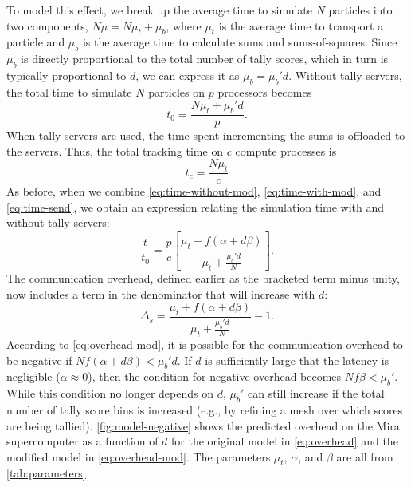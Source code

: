 \documentclass{snamc2013}
\begin{document}
To model this effect, we break up the average time to simulate $N$ particles
into two components, $N\mu = N\mu_t + \mu_b$, where $\mu_t$ is the average time
to transport a particle and $\mu_b$ is the average time to calculate sums and
sums-of-squares. Since $\mu_b$ is directly proportional to the total number of
tally scores, which in turn is typically proportional to $d$, we can express it
as $\mu_b = \mu_b' d$. Without tally servers, the total time to simulate $N$
particles on $p$ processors becomes
\begin{equation}
  \label{eq:time-without-mod}
  t_0 = \frac{N\mu_t + \mu_b' d}{p}.
\end{equation}
When tally servers are used, the time spent incrementing the sums is offloaded
to the servers. Thus, the total tracking time on $c$ compute processes is
\begin{equation}
  \label{eq:time-with-mod}
  t_c = \frac{N\mu_t}{c}
\end{equation}
As before, when we combine \autoref{eq:time-without-mod},
\autoref{eq:time-with-mod}, and \autoref{eq:time-send}, we obtain an expression
relating the simulation time with and without tally servers:
\begin{equation}
  \label{eq:relation-mod}
  \frac{t}{t_0} = \frac{p}{c} \left [ \frac{\mu_t + f \left ( \alpha + d\beta
      \right )}{\mu_t + \frac{\mu_b' d}{N}} \right ].
\end{equation}
The communication overhead, defined earlier as the bracketed term minus unity,
now includes a term in the denominator that will increase with $d$:
\begin{equation}
  \label{eq:overhead-mod}
  \Delta_s = \frac{\mu_t + f \left ( \alpha + d\beta \right )}{\mu_t +
    \frac{\mu_b' d}{N}} - 1.
\end{equation}
According to \autoref{eq:overhead-mod}, it is possible for the communication
overhead to be negative if $Nf ( \alpha + d\beta ) < \mu_b' d$. If $d$ is
sufficiently large that the latency is negligible ($\alpha \approx 0$), then the
condition for negative overhead becomes $Nf\beta < \mu_b'$. While this condition
no longer depends on $d$, $\mu_b'$ can still increase if the total number of
tally score bins is increased (e.g., by refining a mesh over which scores are
being tallied). \autoref{fig:model-negative} shows the predicted overhead on the
Mira supercomputer as a function of $d$ for the original model in
\autoref{eq:overhead} and the modified model in \autoref{eq:overhead-mod}. The
parameters $\mu_t$, $\alpha$, and $\beta$ are all from \autoref{tab:parameters}
\end{document}
